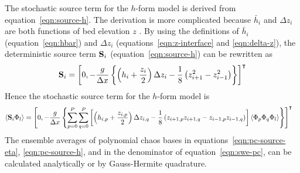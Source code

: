 The stochastic source term for the $h$-form model is derived from equation~\eqref{eqn:source-h}.  The derivation is more complicated because $\bar{h}_i$ and $\Delta z_i$ are both functions of bed elevation $z$ .
By using the definitions of $\bar{h}_i$ (equation~\ref{eqn:hbar}) and $\Delta z_i$ (equations~\ref{eqn:z-interface} and \ref{eqn:delta-z}), the deterministic source term $\mathbf{S}_i$ (equation~\ref{eqn:source-h}) can be rewritten as
\begin{align}
\mathbf{S}_i = \left[ 0, -\frac{g}{\Delta x} \left\{
         \left(h_i + \frac{z_i}{2} \right) \Delta z_i
        - \frac{1}{8} \left( z_{i+1}^2 - z_{i-1}^2 \right)
        \right\} \right]^\intercal
\end{align}
Hence the stochastic source term for the $h$-form model is
\begin{align}
    \left\langle \mathbf{S}_i \Phi_l \right\rangle &= \left[ 0,
    - \frac{g}{\Delta x} \left\{
    \sum_{p=0}^P \sum_{q=0}^P
    \left[
    \left( h_{i,p} + \frac{z_{i,p}}{2} \right) \Delta z_{i,q} 
    - \frac{1}{8}
    \left( z_{i+1,p} z_{i+1,q} - z_{i-1,p} z_{i-1,q} \right)
    \right]
    \left\langle \Phi_p \Phi_q \Phi_l \right\rangle
    \right\}
    \right]^\intercal
\label{eqn:pc-source-h}
\end{align}
The ensemble averages of polynomial chaos bases in equations~\eqref{eqn:pc-source-eta}, \eqref{eqn:pc-source-h}, and in the denominator of equation~\eqref{eqn:swe-pc}, can be calculated analytically or by Gauss-Hermite quadrature.

